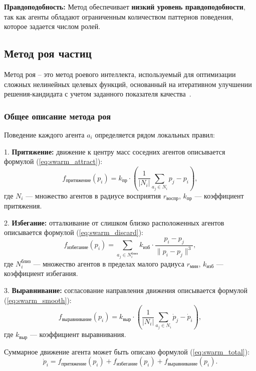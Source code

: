 \textbf{Правдоподобность:}  
Метод обеспечивает \textbf{низкий уровень правдоподобности}, так как агенты обладают ограниченным количеством паттернов поведения, которое задается числом ролей.

\subsection{Метод роя частиц}

Метод роя -- это метод роевого интеллекта, используемый для оптимизации сложных нелинейных целевых функций, основанный на итеративном улучшении решения-кандидата с учетом заданного показателя качества~\cite{particle-swarm}.

\subsubsection*{Общее описание метода роя}
Поведение каждого агента $a_i$ определяется рядом локальных правил:  

1. \textbf{Притяжение:} движение к центру масс соседних агентов описывается формулой (\ref{eq:swarm_attract}):  
\begin{equation}
	\label{eq:swarm_attract}
	f_{\text{притяжение}}(p_i) = k_{\text{пр}} \cdot \left( \frac{1}{|N_i|} \sum_{a_j \in N_i} p_j - p_i \right),
\end{equation}
где $N_i$ — множество агентов в радиусе восприятия $r_{\text{воспр}}$, $k_{\text{пр}}$ — коэффициент притяжения.

2. \textbf{Избегание:} отталкивание от слишком близко расположенных агентов описывается формулой (\ref{eq:swarm_discard}):  
\begin{equation}
	\label{eq:swarm_discard}
	f_{\text{избегание}}(p_i) = \sum_{a_j \in N_i^{\text{близ}}} k_{\text{изб}} \cdot \frac{p_i - p_j}{\|p_i - p_j\|^3},
\end{equation}
где $N_i^{\text{близ}}$ — множество агентов в пределах малого радиуса $r_{\text{мин}}$, $k_{\text{изб}}$ — коэффициент избегания.

3. \textbf{Выравнивание:} согласование направления движения описывается формулой (\ref{eq:swarm_smooth}):  
\begin{equation}
	\label{eq:swarm_smooth}
	f_{\text{выравнивание}}(p_i) = k_{\text{выр}} \cdot \left( \frac{1}{|N_i|} \sum_{a_j \in N_i} \dot{p}_j - \dot{p}_i \right),
\end{equation}
где $k_{\text{выр}}$ — коэффициент выравнивания.

Суммарное движение агента может быть описано формулой (\ref{eq:swarm_total}):
\begin{equation}
	\label{eq:swarm_total}
	\dot{p}_i = f_{\text{притяжение}}(p_i) + f_{\text{избегание}}(p_i) + f_{\text{выравнивание}}(p_i).
\end{equation}

